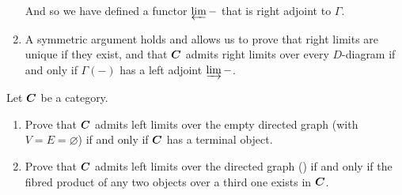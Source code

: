 \begin{sol}
\begin{enumerate}[label=\alph*)]
		And so we have defined a functor $\varprojlim -$ that is right adjoint to $\Gamma$. 
		
		\item A symmetric argument holds and allows us to prove that right limits are unique if they exist, and that $\boldsymbol{C}$ admits right limits over every $D$-diagram if and only if $\Gamma(-)$ has a left adjoint $\varinjlim -$.

	\end{enumerate}
\end{sol}

\begin{ex}
	Let $\boldsymbol{C}$ be a category. 
	\begin{enumerate}[label=\alph*)]
		\item Prove that $\boldsymbol{C}$ admits left limits over the empty directed graph (with $V = E = \varnothing$) if and only if $\boldsymbol{C}$ has a terminal object.

		\item Prove that $\boldsymbol{C}$ admits left limits over the directed graph () if and only if the fibred product of any two objects over a third one exists in $\boldsymbol{C}$.
	\end{enumerate}
\end{ex}


